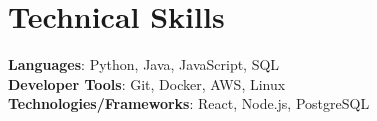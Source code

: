 \documentclass[letterpaper,11pt]{article}
\begin{document}
\section{Technical Skills}
 \begin{itemize}[leftmargin=0.15in, label={}]
    \small{\item{
     \textbf{Languages}{: Python, Java, JavaScript, SQL} \\
     \textbf{Developer Tools}{: Git, Docker, AWS, Linux} \\
     \textbf{Technologies/Frameworks}{: React, Node.js, PostgreSQL} \\
    }}
 \end{itemize}
 \vspace{-16pt}
\end{document}
